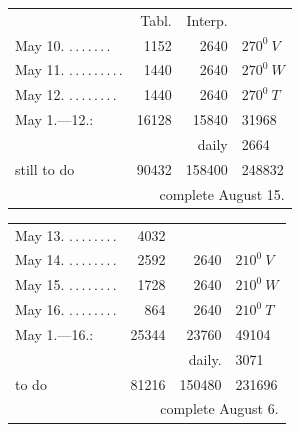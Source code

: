 \begin{center}
\begin{tabular}{@{}p{.36\linewidth}rrl@{}}
&Tabl.&Interp.&\\
May 10. \BJournalDay{☉}\nobreak\hspace{.2em}\mbox{.\,.\,.\,.\,.\,.\,.}\hfill&1152&2640&\(\mathit{270}^0\ V\)\\
May 11. \BJournalDay{☾}\nobreak\hspace{.2em}\mbox{.\,.\,.\,.\,.\,.\,.\,.\,.}\hfill&1440&2640&\(\mathit{270}^0\ W\)\\
May 12. \BJournalDay{♂}\nobreak\hspace{.2em}\mbox{.\,.\,.\,.\,.\,.\,.\,.}\hfill&1440&2640&\(\mathit{270}^0\ T\)\\
\hfill May 1.—12.:&16128&15840&31968\\
&&daily&2664\\
\hfill still to do&90432&158400&248832\\
\multicolumn{4}{r}{complete August 15.}\\
\hline
\end{tabular}
\end{center}
\begin{center}
\begin{tabular}{@{}p{.36\linewidth}rrl@{}}
May 13. \BJournalDay{☿}\nobreak\hspace{.2em}\mbox{.\,.\,.\,.\,.\,.\,.\,.}\hfill&4032&&\\
May 14. \BJournalDay{♃}\nobreak\hspace{.2em}\mbox{.\,.\,.\,.\,.\,.\,.\,.}\hfill&2592&2640&\(\mathit{210}^0\ V\)\\
May 15. \BJournalDay{♀}\nobreak\hspace{.2em}\mbox{.\,.\,.\,.\,.\,.\,.\,.}\hfill&1728&2640&\(\mathit{210}^0\ W\)\\
May 16. \BJournalDay{♄}\nobreak\hspace{.2em}\mbox{.\,.\,.\,.\,.\,.\,.\,.}\hfill&864&2640&\(\mathit{210}^0\ T\)\\
\hfill May 1.—16.:&25344&23760&49104\\
&&daily.&3071\\
\hfill to do&81216&150480&231696\\
\multicolumn{4}{r}{complete August 6.}\\
\hline
\end{tabular}
\end{center}
